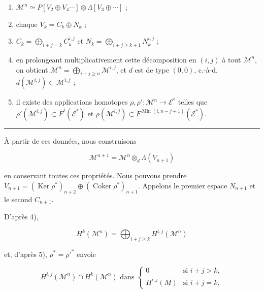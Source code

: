 \documentclass[
  french,
  a3paper,
  a3paper]{extarticle}
\begin{document}
\begin{enumerate}
\def\labelenumi{\arabic{enumi})}
\item
  \(\mathcal{M}^n\simeq P[V_2\oplus V_4\cdots]\otimes\Lambda[V_3\oplus\cdots]\)
  ;
\item
  chaque \(V_k=C_k\oplus N_k\) ;
\item
  \(C_k=\bigoplus_{i+j=k}C_k^{i,j}\) et
  \(N_k=\bigoplus_{i+j\geq k+1}N_k^{i,j}\) ;
\item
  en prolongeant multiplicativement cette décomposition en \((i,j)\) à
  tout \(\mathcal{M}^n\), on obtient
  \(\mathcal{M}^n=\bigoplus_{i+j\geq n}\mathcal{M}^{i,j}\), et \(d\) est
  de type \((0,0)\),
  c.-à-d.~\(d(\mathcal{M}^{i,j})\subset\mathcal{M}^{i,j}\) ;
\item
  il existe des applications homotopes
  \(\rho,\rho':\mathcal{M}^n\to\mathcal{E}^*\) telles que
  \(\rho'(\mathcal{M}^{i,j})\subset\bar F^j(\mathcal{E}^*)\) et
  \(\rho(\mathcal{M}^{i,j})\subset F^{\operatorname{Min}(i,n-j+1)}(\mathcal{E}^*)\).
\end{enumerate}

\clearpage



\par

\vspace{0.7mm}\hrule\vspace{1.6mm}

\fontsize{9}{11}\selectfont

À partir de ces données, nous construisons

\[\mathcal{M}^{n+1}=\mathcal{M}^n\otimes_d\Lambda(V_{n+1})\]

en conservant toutes ces propriétés. Nous pouvons prendre
\(V_{n+1}=(\operatorname{Ker}\rho^*)_{n+2}\oplus(\operatorname{Coker}\rho^*)_{n+1}\).
Appelons le premier espace \(N_{n+1}\) et le second \(C_{n+1}\).

D'après 4),

\[H^k(\mathcal{M}^n)=\bigoplus_{i+j\geq k}H^{i,j}(\mathcal{M}^n)\]

et, d'après 5), \(\rho^*=\rho'^*\) envoie

\[H^{i,j}(\mathcal{M}^n)\cap H^k(\mathcal{M}^n)\text{ dans }\begin{cases}0 & \text{si }i+j>k,\\ H^{i,j}(M) & \text{si }i+j=k.\end{cases}\]
\end{document}
